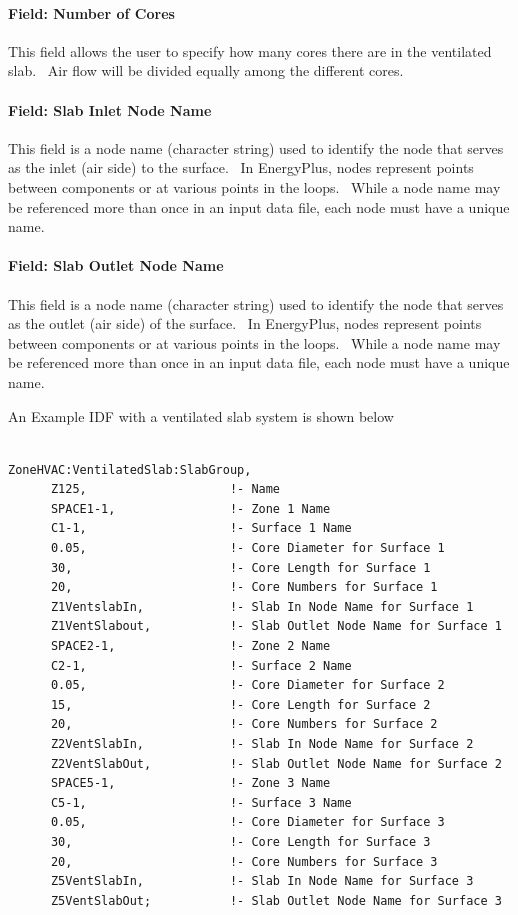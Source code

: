 \paragraph{Field: Number of Cores}\label{field-number-of-cores-1}

This field allows the user to specify how many cores there are in the ventilated slab.~ Air flow will be divided equally among the different cores.

\paragraph{Field: Slab Inlet Node Name}\label{field-slab-inlet-node-name}

This field is a node name (character string) used to identify the node that serves as the inlet (air side) to the surface.~ In EnergyPlus, nodes represent points between components or at various points in the loops.~ While a node name may be referenced more than once in an input data file, each node must have a unique name.

\paragraph{Field: Slab Outlet Node Name}\label{field-slab-outlet-node-name}

This field is a node name (character string) used to identify the node that serves as the outlet (air side) of the surface.~ In EnergyPlus, nodes represent points between components or at various points in the loops.~ While a node name may be referenced more than once in an input data file, each node must have a unique name.

An Example IDF with a ventilated slab system is shown below

\begin{lstlisting}

ZoneHVAC:VentilatedSlab:SlabGroup,
      Z125,                    !- Name
      SPACE1-1,                !- Zone 1 Name
      C1-1,                    !- Surface 1 Name
      0.05,                    !- Core Diameter for Surface 1
      30,                      !- Core Length for Surface 1
      20,                      !- Core Numbers for Surface 1
      Z1VentslabIn,            !- Slab In Node Name for Surface 1
      Z1VentSlabout,           !- Slab Outlet Node Name for Surface 1
      SPACE2-1,                !- Zone 2 Name
      C2-1,                    !- Surface 2 Name
      0.05,                    !- Core Diameter for Surface 2
      15,                      !- Core Length for Surface 2
      20,                      !- Core Numbers for Surface 2
      Z2VentSlabIn,            !- Slab In Node Name for Surface 2
      Z2VentSlabOut,           !- Slab Outlet Node Name for Surface 2
      SPACE5-1,                !- Zone 3 Name
      C5-1,                    !- Surface 3 Name
      0.05,                    !- Core Diameter for Surface 3
      30,                      !- Core Length for Surface 3
      20,                      !- Core Numbers for Surface 3
      Z5VentSlabIn,            !- Slab In Node Name for Surface 3
      Z5VentSlabOut;           !- Slab Outlet Node Name for Surface 3
\end{lstlisting}